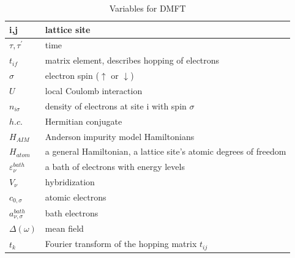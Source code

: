 \documentclass[12 pt]{article}
\begin{document}
  \begin{table}[ht]
    \centering
    \caption{Variables for DMFT}
    \label{Variables for DMFT}
    \vspace{2ex}

  \begin{tabular}{|l|l|}
    \hline
    i,j & lattice site \\ \hline

    $\tau,\tau^\prime$ & time \\ \hline

    $t_{if}$ & matrix element, describes hopping of electrons \\ \hline

    $\sigma$ &  electron spin ($\uparrow$ or $\downarrow$)\\ \hline

    $U$ &  local Coulomb interaction\\ \hline

    $n_{i\sigma}$ &  density of electrons at site i with spin $\sigma$ \\ \hline

    $h.c.$ &  Hermitian conjugate \\ \hline

    $H_{AIM}$ &  Anderson impurity model Hamiltonians \\ \hline

    $H_{atom}$ &  a general Hamiltonian, a lattice site's atomic degrees of freedom \\ \hline

    $\varepsilon_{\nu}^{bath}$ &  a bath of electrons with energy levels \\ \hline

    $V_\nu$ &  hybridization \\ \hline

    $c_{0, \sigma}$ &  atomic electrons \\ \hline

    $a_{\nu,\sigma}^{bath}$ &  bath electrons \\ \hline

    $\varDelta(\omega)$ &  mean field \\ \hline

    $t_k$ &  Fourier transform of the hopping matrix $t_{ij}$ \\ \hline
 
  \end{tabular}

  \end{table}
  
\end{document}

